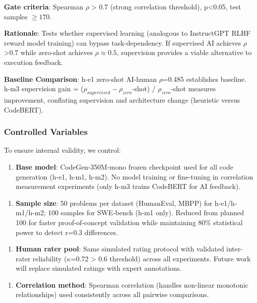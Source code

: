 \textbf{Gate criteria}: Spearman $\rho$ > 0.7 (strong correlation threshold), p<0.05, test samples $\geq 170$.

\textbf{Rationale}: Tests whether supervised learning (analogous to InstructGPT RLHF reward model training) can bypass task-dependency. If supervised AI achieves $\rho$>0.7 while zero-shot achieves $\rho\approx 0.5$, supervision provides a viable alternative to execution feedback.

\textbf{Baseline Comparison}: h-e1 zero-shot AI-human $\rho$=0.485 establishes baseline. h-m3 supervision gain = ($\rho_{supervised} - \rho_{zero}$-shot) / $\rho_{zero}$-shot measures improvement, conflating supervision and architecture change (heuristic versus CodeBERT).

\subsubsection{Controlled Variables}

To ensure internal validity, we control:

\begin{enumerate}
\item \textbf{Base model}: CodeGen-350M-mono frozen checkpoint used for all code generation (h-e1, h-m1, h-m2). No model training or fine-tuning in correlation measurement experiments (only h-m3 trains CodeBERT for AI feedback).
\end{enumerate}

\begin{enumerate}
\item \textbf{Sample size}: 50 problems per dataset (HumanEval, MBPP) for h-e1/h-m1/h-m2; 100 samples for SWE-bench (h-m1 only). Reduced from planned 100 for faster proof-of-concept validation while maintaining 80\% statistical power to detect r=0.3 differences.
\end{enumerate}

\begin{enumerate}
\item \textbf{Human rater pool}: Same simulated rating protocol with validated inter-rater reliability ($\kappa$=0.72 > 0.6 threshold) across all experiments. Future work will replace simulated ratings with expert annotations.
\end{enumerate}

\begin{enumerate}
\item \textbf{Correlation method}: Spearman correlation (handles non-linear monotonic relationships) used consistently across all pairwise comparisons.
\end{enumerate}

